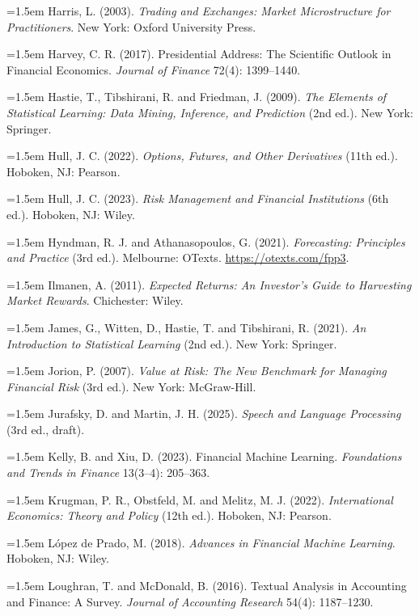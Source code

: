 \hangindent=1.5em Harris, L. (2003). \emph{Trading and Exchanges: Market Microstructure for Practitioners}. New York: Oxford University Press.

\hangindent=1.5em Harvey, C. R. (2017). Presidential Address: The Scientific Outlook in Financial Economics. \emph{Journal of Finance} 72(4): 1399--1440.

\hangindent=1.5em Hastie, T., Tibshirani, R. and Friedman, J. (2009). \emph{The Elements of Statistical Learning: Data Mining, Inference, and Prediction} (2nd ed.). New York: Springer.

\hangindent=1.5em Hull, J. C. (2022). \emph{Options, Futures, and Other Derivatives} (11th ed.). Hoboken, NJ: Pearson.

\hangindent=1.5em Hull, J. C. (2023). \emph{Risk Management and Financial Institutions} (6th ed.). Hoboken, NJ: Wiley.

\hangindent=1.5em Hyndman, R. J. and Athanasopoulos, G. (2021). \emph{Forecasting: Principles and Practice} (3rd ed.). Melbourne: OTexts. \url{https://otexts.com/fpp3}.

\hangindent=1.5em Ilmanen, A. (2011). \emph{Expected Returns: An Investor's Guide to Harvesting Market Rewards}. Chichester: Wiley.

\hangindent=1.5em James, G., Witten, D., Hastie, T. and Tibshirani, R. (2021). \emph{An Introduction to Statistical Learning} (2nd ed.). New York: Springer.

\hangindent=1.5em Jorion, P. (2007). \emph{Value at Risk: The New Benchmark for Managing Financial Risk} (3rd ed.). New York: McGraw-Hill.

\hangindent=1.5em Jurafsky, D. and Martin, J. H. (2025). \emph{Speech and Language Processing} (3rd ed., draft). %

\hangindent=1.5em Kelly, B. and Xiu, D. (2023). Financial Machine Learning. \emph{Foundations and Trends in Finance} 13(3--4): 205--363.

\hangindent=1.5em Krugman, P. R., Obstfeld, M. and Melitz, M. J. (2022). \emph{International Economics: Theory and Policy} (12th ed.). Hoboken, NJ: Pearson.

\hangindent=1.5em L\'opez de Prado, M. (2018). \emph{Advances in Financial Machine Learning}. Hoboken, NJ: Wiley.

\hangindent=1.5em Loughran, T. and McDonald, B. (2016). Textual Analysis in Accounting and Finance: A Survey. \emph{Journal of Accounting Research} 54(4): 1187--1230.

